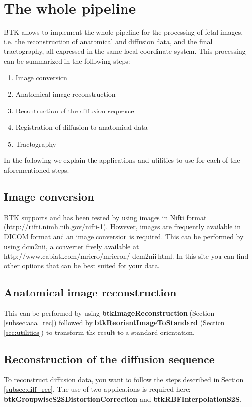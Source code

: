\section{The whole pipeline}
BTK allows to implement the whole pipeline for the processing of fetal images,
i.e. the reconstruction of anatomical and diffusion data, and the final
tractography, all expressed in the same local coordinate system. This
processing can be summarized in the following steps:

\begin{enumerate}
 \item Image conversion
 \item Anatomical image reconstruction
 \item Recontruction of the diffusion sequence
 \item Registration of diffusion to anatomical data
 \item Tractography
\end{enumerate}

In the following we explain the applications and utilities to use for each of
the aforementioned steps.

\subsection{Image conversion}
BTK supports and has been tested by using images in Nifti format
(http://nifti.nimh.nih.gov/nifti-1). However, images are frequently available in
DICOM format and an image conversion is required. This can be performed by using
dcm2nii, a converter freely available at http://www.cabiatl.com/mricro/mricron/
dcm2nii.html. In this site you can find other options that can be best suited
for your data.

\subsection{Anatomical image reconstruction}
This can be performed by using \textbf{btkImageReconstruction} (Section
\ref{subsec:ana_rec}) followed by \textbf{btkReorientImageToStandard} (Section
\ref{sec:utilities}) to transform the result to a standard orientation.

\subsection{Reconstruction of the diffusion sequence}
To reconstruct diffusion data, you want to follow the steps described in
Section \ref{subsec:diff_rec}. The use of two applications is required here:
\textbf{btkGroupwiseS2SDistortionCorrection} and
\textbf{btkRBFInterpolationS2S}.

